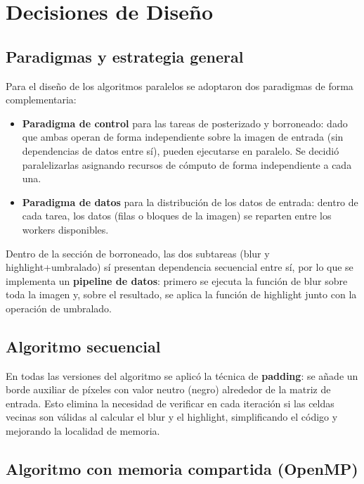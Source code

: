 

\chapter{Decisiones de Diseño}
 
\section{Paradigmas y estrategia general}
 
Para el diseño de los algoritmos paralelos se adoptaron dos paradigmas de forma
complementaria:
 
\begin{itemize}
  \item \textbf{Paradigma de control} para las tareas de posterizado y borroneado: dado que
        ambas operan de forma independiente sobre la imagen de entrada (sin dependencias de
        datos entre sí), pueden ejecutarse en paralelo. Se decidió paralelizarlas asignando
        recursos de cómputo de forma independiente a cada una.
 
  \item \textbf{Paradigma de datos} para la distribución de los datos de entrada: dentro de
        cada tarea, los datos (filas o bloques de la imagen) se reparten entre los workers
        disponibles.
\end{itemize}
 
Dentro de la sección de borroneado, las dos subtareas (blur y highlight+umbralado) sí
presentan dependencia secuencial entre sí, por lo que se implementa un \textbf{pipeline de
datos}: primero se ejecuta la función de blur sobre toda la imagen y, sobre el resultado,
se aplica la función de highlight junto con la operación de umbralado.
 
\section{Algoritmo secuencial}
 
En todas las versiones del algoritmo se aplicó la técnica de \textbf{padding}: se añade un
borde auxiliar de píxeles con valor neutro (negro) alrededor de la matriz de entrada. Esto
elimina la necesidad de verificar en cada iteración si las celdas vecinas son válidas al
calcular el blur y el highlight, simplificando el código y mejorando la localidad de memoria.
 
\section{Algoritmo con memoria compartida (OpenMP)}
 
